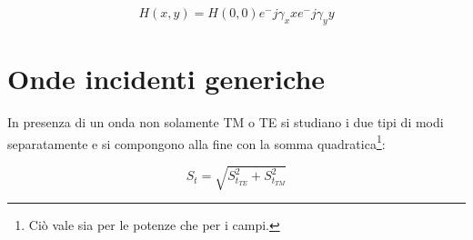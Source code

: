 			\begin{equation}
			H(x,y)=H(0,0)e^-{j\gamma_x x}e^-{j\gamma_y y}
			\end{equation}
		

		\section{Onde incidenti generiche}

		In presenza di un onda non solamente TM o TE si studiano i due tipi di modi separatamente e si compongono alla fine con la somma quadratica\footnote{Ciò vale sia per le potenze che per i campi.}:

		\begin{equation}
		S_{t}=\sqrt{S_{t_{TE}}^2 +S_{t_{TM}}^2 }
		\end{equation}